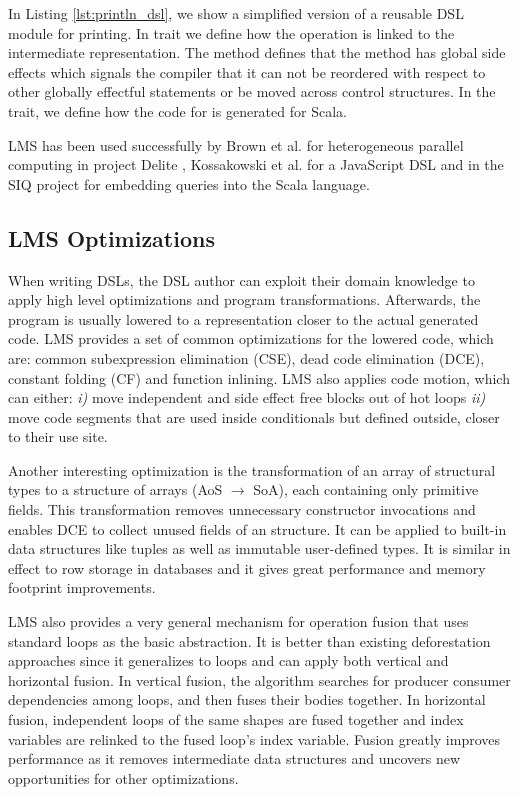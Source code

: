  
In Listing \ref{lst:println_dsl}, we show a simplified version of a reusable DSL module for printing. In trait  we define how the  operation is linked to the intermediate representation. The  method defines that the  method has global side effects which signals the compiler that it can not be reordered with respect to other globally effectful statements or be moved across control structures. In the  trait, we define how the code for  is generated for Scala. 

LMS has been used successfully by Brown et al. for heterogeneous parallel computing in project Delite \cite{brown_heterogeneous_2011}, Kossakowski et al. for a JavaScript DSL \cite{greg} and in the SIQ project for embedding queries into the Scala language.

\subsection{LMS Optimizations}
\label{subsec:lms-optimizations}
When writing DSLs, the DSL author can exploit their domain knowledge to apply high level optimizations and program transformations. Afterwards, the program is usually lowered to a representation closer to the actual generated code. LMS provides a set of common optimizations for the lowered code, which are: common subexpression elimination (CSE), dead code elimination (DCE), constant folding (CF) and function inlining. LMS also applies code motion, which can either: \emph{i)} move independent and side effect free blocks out of hot loops \emph{ii)} move code segments that are used inside conditionals but defined outside, closer to their use site.   

Another interesting optimization is the transformation of an array of structural types to a structure of arrays (AoS $\rightarrow$ SoA), each containing only primitive fields. This transformation removes unnecessary constructor invocations and enables DCE to collect unused fields of an structure. It can be applied to built-in data structures like tuples as well as immutable user-defined types. It is similar in effect to row storage in databases and it gives great performance and memory footprint improvements.

LMS also provides a very general mechanism for operation fusion that uses standard loops as the basic abstraction. It is better than existing deforestation approaches since it generalizes to loops and can apply both vertical and horizontal fusion. In vertical fusion, the algorithm searches for producer consumer dependencies among loops, and then fuses their bodies together. In horizontal fusion, independent loops of the same shapes are fused together and index variables are relinked to the fused loop's index variable. Fusion greatly improves performance as it removes intermediate data structures and uncovers new opportunities for other optimizations.

